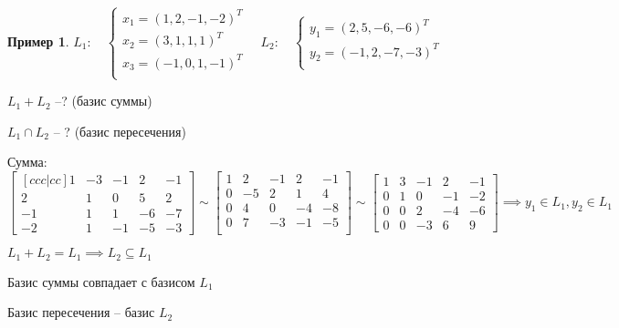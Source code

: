 \documentclass{book}
\theoremstyle{definition}
\newtheorem*{example}{Пример}
\begin{document}
    \begin{example}
        $L_1:\quad \begin{cases}
            x_1 = \left( 1, 2, -1, -2 \right) ^T\\
            x_2 = \left( 3, 1, 1, 1 \right) ^T\\
            x_3 = \left( -1,0,1,-1 \right) ^T\\
        \end{cases}\quad L_2:\quad \begin{cases}
        y_1 = \left( 2, 5, -6, -6 \right) ^T\\
        y_2 = \left( -1,2,-7,-3 \right)^T \\
        \end{cases}$ 

        $L_1+L_2 $ --? (базис суммы)

        $L_1\cap L_2$ -- ? (базис пересечения)

        Сумма: $ \begin{bmatrix} [c c c|c c] 1&-3&-1&2&-1\\2&1&0&5&2\\-1&1&1&-6&-7\\-2&1&-1&-5&-3 \end{bmatrix} \sim  \begin{bmatrix} 1&2&-1&2&-1\\0&-5&2&1&4\\0&4&0&-4&-8\\0&7&-3&-1&-5\\ \end{bmatrix} \sim \begin{bmatrix} 1&3&-1&2&-1\\0&1&0&-1&-2\\0&0&2&-4&-6\\0&0&-3&6&9 \end{bmatrix} \implies y_1\in L_1, y_2\in L_1$

        $L_1+L_2 = L_1 \implies L_2\subseteq L_1$

        Базис суммы совпадает с базисом $L_1$

        Базис пересечения -- базис $L_2$
    \end{example}
\end{document}

